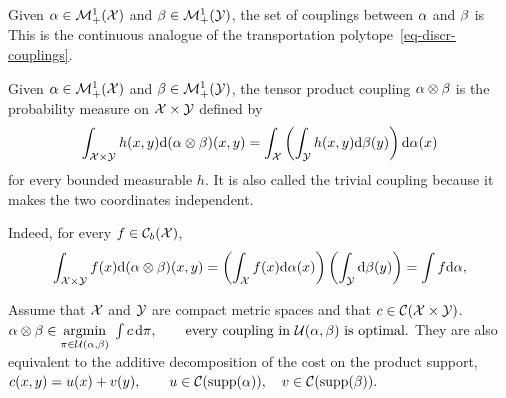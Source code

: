 \begin{defn}[Couplings]\label{def-continuous-couplings}
Given $\alpha\in\mathcal{M}_+^1(\mathcal{X})$ and $\beta\in\mathcal{M}_+^1(\mathcal{Y})$, the set of couplings between $\alpha$ and $\beta$ is
This is the continuous analogue of the transportation polytope~\eqref{eq-discr-couplings}.
\end{defn}
\begin{defn}\label{def-tensor-product-coupling}
Given $\alpha\in\mathcal{M}_+^1(\mathcal{X})$ and $\beta\in\mathcal{M}_+^1(\mathcal{Y})$, the tensor product coupling $\alpha\otimes\beta$ is the probability measure on $\mathcal{X}\times\mathcal{Y}$ defined by
\[
\int_{\mathcal{X}\times\mathcal{Y}} h(x,y)\mathrm{d}(\alpha\otimes\beta)(x,y)
=
\int_{\mathcal{X}}\left(\int_{\mathcal{Y}} h(x,y)\mathrm{d}\beta(y)\right)\mathrm{d}\alpha(x)
\]
for every bounded measurable $h$. It is also called the trivial coupling because it makes the two coordinates independent.
\end{defn}
Indeed, for every $f\in\mathcal{C}_b(\mathcal{X})$,
\[
\int_{\mathcal{X}\times\mathcal{Y}} f(x)\mathrm{d}(\alpha\otimes\beta)(x,y)
=
\left(\int_{\mathcal{X}} f(x)\mathrm{d}\alpha(x)\right)\left(\int_{\mathcal{Y}}\mathrm{d}\beta(y)\right)
=
\int f\mathrm{d}\alpha,
\]
\begin{prop}\label{prop-product-coupling-degenerate}
Assume that $\mathcal{X}$ and $\mathcal{Y}$ are compact metric spaces and that $c\in\mathcal{C}(\mathcal{X}\times\mathcal{Y})$.
\(\alpha\otimes\beta\in\underset{\pi\in\mathcal{U}(\alpha,\beta)}{\operatorname{argmin}}\;\int c\,\mathrm{d}\pi, \qquad \text{every coupling in }\mathcal{U}(\alpha,\beta)\text{ is optimal}.\)
They are also equivalent to the additive decomposition of the cost on the product support, \(c(x,y)=u(x)+v(y), \qquad u\in\mathcal{C}(\operatorname{supp}(\alpha)),\quad v\in\mathcal{C}(\operatorname{supp}(\beta)).\)
\end{prop}
